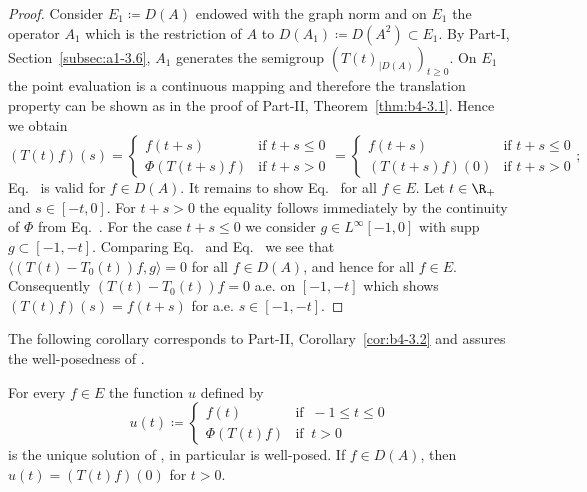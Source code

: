 \begin{proof}
Consider $E_1 \coloneqq D(A)$ endowed with the graph norm 
and on $E_1$ the operator $A_1$ which is the restriction of\/ $A$ to $D(A_1) \coloneqq D(A^{2})\subset E_1$.
By 
Part-I, Section~\ref{subsec:a1-3.6}, $A_1$ generates the semigroup $(T(t)_{|D(A)})_{t \geq 0}$.
On $E_1$ the point evaluation is a continuous mapping and therefore the translation property can be shown as in the proof of Part-II, Theorem~\ref{thm:b4-3.1}.
Hence we obtain
\begin{equation}\label{eq:c4-3.4}
(T(t)f)(s)= \begin{cases}
    f(t+s) &\text{if } t+s \leq 0 \\
    \Phi(T(t+s)f) &\text{if } t+s > 0
\end{cases} = \begin{cases}
    f(t+s) &\text{if } t+s \leq 0 \\
    (T(t+s)f)(0) &\text{if } t+s > 0
\end{cases};
\end{equation}
\ie Eq.~ is valid for $f \in D(A)$.
It remains to show Eq.~ for all $f \in E$.
Let $t \in \R_+$ and $s \in [-t,0]$.
For $t + s > 0$ the equality follows immediately by the continuity of\/ $\Phi$ from Eq.~.
For the case $t + s \leq 0$ we consider $g \in L^{\infty}[-1,0]$ with supp $g \subset [-1,-t]$.
Comparing Eq.~ and Eq.~ we see that $\langle(T(t)-T_0(t))f,g\rangle = 0$ for all $f \in D(A)$, and hence for all $f \in E$.
Consequently $(T(t)-T_{0}(t))f = 0$ a.e. on $[-1,-t]$ which shows $(T(t)f)(s) = f(t+s)$ for a.e. $s \in [-1,-t]$.
\end{proof}
The following corollary corresponds to Part-II, Corollary~\ref{cor:b4-3.2} and assures the well-posed\-ness of .
\begin{corollary}\label{cor:c4-3.2}
%
For every $f \in E$ the function $u$ defined by
\begin{equation}\label{eq:c4-3.5}
u(t) \coloneqq  \begin{cases}
    f(t) & \text{if } \ -1 \leq t \leq 0 \\
    \Phi(T(t)f) & \text{if } \ t > 0
\end{cases}
\end{equation}
is the unique solution of , in particular  is well-posed.
If\/ $f \in D(A)$, then $u(t) = (T(t)f)(0)$ for $t > 0$.
\end{corollary}
